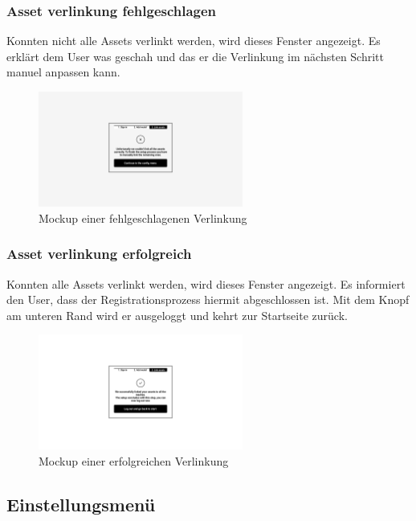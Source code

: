 \subsubsection{Asset verlinkung fehlgeschlagen}
Konnten nicht alle Assets verlinkt werden, wird dieses Fenster angezeigt. Es erklärt dem User was geschah und das er die Verlinkung im nächsten Schritt manuel anpassen kann.
\begin{figure}[H]
  \centering
  \includegraphics[angle=270,width=0.6\textwidth]{./mockups/register/redirect.pdf}
  \caption[{Mockup einer fehlgeschlagenen Verlinkung}]{Mockup einer fehlgeschlagenen Verlinkung}
  \label{fig:mck-redirect}
\end{figure}
\pagebreak
\subsubsection{Asset verlinkung erfolgreich}
Konnten alle Assets verlinkt werden, wird dieses Fenster angezeigt. Es informiert den User, dass der Registrationsprozess hiermit abgeschlossen ist. Mit dem Knopf am unteren Rand wird er ausgeloggt und kehrt zur Startseite zurück.
\begin{figure}[H]
  \centering
  \includegraphics[angle=270,width=0.6\textwidth]{./mockups/register/all_success.pdf}
  \caption[{Mockup einer erfolgreichen Verlinkung}]{Mockup einer erfolgreichen Verlinkung}
  \label{fig:mck-all_success}
\end{figure}
\pagebreak
\subsection{Einstellungsmenü}
